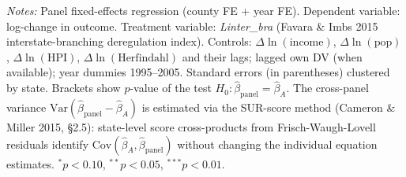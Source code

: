 \begin{table}[htbp]
\begin{tablenotes}
\small
\item \textit{Notes:} Panel fixed-effects regression (county FE + year FE).
Dependent variable: log-change in outcome. Treatment variable: \textit{Linter\_bra}
(Favara \& Imbs 2015 interstate-branching deregulation index).
Controls: $\Delta\ln(\text{income})$, $\Delta\ln(\text{pop})$,
$\Delta\ln(\text{HPI})$, $\Delta\ln(\text{Herfindahl})$ and their lags;
lagged own DV (when available); year dummies 1995--2005.
Standard errors (in parentheses) clustered by state.
Brackets show $p$-value of the test $H_0: \hat\beta_{\text{panel}} = \hat\beta_A$.
The cross-panel variance $\mathrm{Var}(\hat\beta_{\text{panel}} - \hat\beta_A)$
is estimated via the SUR-score method (Cameron \& Miller 2015, \S2.5):
state-level score cross-products from Frisch-Waugh-Lovell residuals
identify $\mathrm{Cov}(\hat\beta_A, \hat\beta_{\text{panel}})$ without changing
the individual equation estimates.
$^{*}p<0.10$, $^{**}p<0.05$, $^{***}p<0.01$.
\end{tablenotes}
\end{table}
